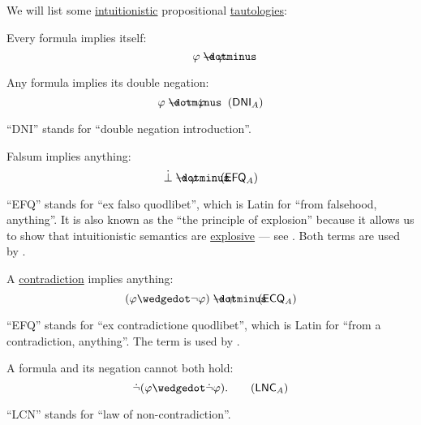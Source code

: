 \begin{proposition}\label{thm:intuitionistic_tautologies}
  We will list some \hyperref[def:propositional_semantics]{intuitionistic} propositional \hyperref[def:propositional_tautology]{tautologies}:
  \begin{thmenum}
     Every formula implies itself:
    \begin{equation}\label{eq:thm:intuitionistic_tautologies/self}
      \varphi \synimplies \varphi.
    \end{equation}

     Any formula implies its double negation:
    \begin{equation}\label{eq:thm:intuitionistic_tautologies/dni}
      \varphi \synimplies \neg \neg \varphi \tag{\( \logic{DNI}_A \)}
    \end{equation}

    \enquote{DNI} stands for \enquote{double negation introduction}.

     Falsum implies anything:
    \begin{equation}\label{eq:thm:intuitionistic_tautologies/efq}
      \synbot \synimplies \varphi \tag{\( \logic{EFQ}_A \)}
    \end{equation}

    \enquote{EFQ} stands for \enquote{ex falso quodlibet}, which is Latin for \enquote{from falsehood, anything}. It is also known as the \enquote{the principle of explosion} because it allows us to show that intuitionistic semantics are \hyperref[def:paraconsistent_consequence_operator]{explosive} --- see . Both terms are used by .

     A \hyperref[def:propositional_contradiction]{contradiction} implies anything:
    \begin{equation}\label{eq:thm:intuitionistic_tautologies/ecq}
      (\varphi \synwedge \neg \varphi) \synimplies \psi \tag{\( \logic{ECQ}_A \)}
    \end{equation}

    \enquote{EFQ} stands for \enquote{ex contradictione quodlibet}, which is Latin for \enquote{from a contradiction, anything}. The term is used by .

     A formula and its negation cannot both hold:
    \begin{equation}\label{eq:thm:intuitionistic_tautologies/lnc}
      \synneg (\varphi \synwedge \synneg \varphi). \tag{\( \logic{LNC}_A \)}
    \end{equation}

    \enquote{LCN} stands for \enquote{law of non-contradiction}.
  \end{thmenum}
\end{proposition}
